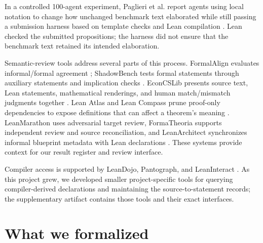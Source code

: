 \documentclass{article}
\begin{document}
In a controlled 100-agent experiment, Paglieri et al. report agents using local
notation to change how unchanged benchmark text elaborated while still passing
a submission harness based on template checks and Lean compilation
\citep{paglieri2026swarm}.  Lean checked the submitted propositions; the harness
did not ensure that the benchmark text retained its intended elaboration.

Semantic-review tools address several parts of this process.  FormalAlign
evaluates informal/formal agreement \citep{lu2025formalalign}; ShadowBench tests
formal statements through auxiliary statements and implication checks
\citep{han2026shadowbench}.  EconCSLib presents source text, Lean statements,
mathematical renderings, and human match/mismatch judgments together
\citep{garg2026econcs}.  Lean Atlas and Lean Compass prune proof-only dependencies
to expose definitions that can affect a theorem's meaning
\citep{yanahama2026leanatlas}.  LeanMarathon uses adversarial target review,
FormaTheoria supports independent review and source reconciliation, and
LeanArchitect synchronizes informal blueprint metadata with Lean declarations
\citep{zhang2026leanmarathon,nie2026formatheoria,zhu2026leanarchitect}.
These systems provide context for our result register and review interface.

Compiler access is supported by LeanDojo, Pantograph, and LeanInteract
\citep{yang2023leandojo,aniva2024pantograph,poiroux2025leaninteract}.
As this project grew, we developed smaller project-specific tools for querying
compiler-derived declarations and maintaining the source-to-statement records;
the supplementary artifact contains those tools and their exact interfaces.

\section{What we formalized}
\label{sec:dk}
\end{document}
